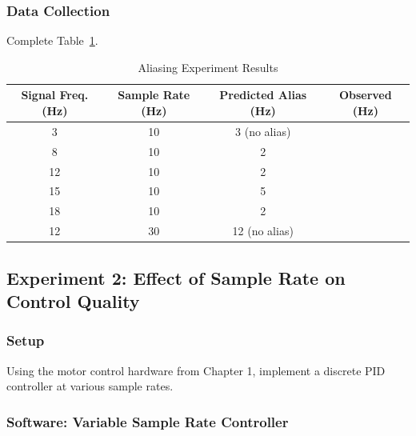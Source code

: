 \subsubsection{Data Collection}

Complete Table~\ref{tab:aliasing_experiment}.

\begin{table}[htbp]
\centering
\caption{Aliasing Experiment Results}
\label{tab:aliasing_experiment}
\begin{tabular}{cccc}
\toprule
\textbf{Signal Freq. (Hz)} & \textbf{Sample Rate (Hz)} & \textbf{Predicted Alias (Hz)} & \textbf{Observed (Hz)} \\
\midrule
3 & 10 & 3 (no alias) & \\
8 & 10 & 2 & \\
12 & 10 & 2 & \\
15 & 10 & 5 & \\
18 & 10 & 2 & \\
12 & 30 & 12 (no alias) & \\
\bottomrule
\end{tabular}
\end{table}

\subsection{Experiment 2: Effect of Sample Rate on Control Quality}

\subsubsection{Setup}

Using the motor control hardware from Chapter 1, implement a discrete PID controller at various sample rates.

\subsubsection{Software: Variable Sample Rate Controller}

